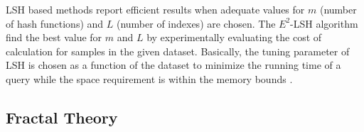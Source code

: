 \documentclass{article}
\begin{document}
LSH based methods report efficient results when adequate values for $m$ (number of hash functions) and $L$ (number of indexes) are chosen. The $E^2$-LSH algorithm find the best value for  $m$ and $L$ by experimentally evaluating the cost of calculation for samples in the given dataset.  Basically, the tuning parameter of LSH is chosen as a function of the dataset to minimize the running time  of a query  while the space requirement is within the memory bounds \cite{LSHBook}.  %


 
 
\subsection{Fractal Theory}
 
\end{document}
